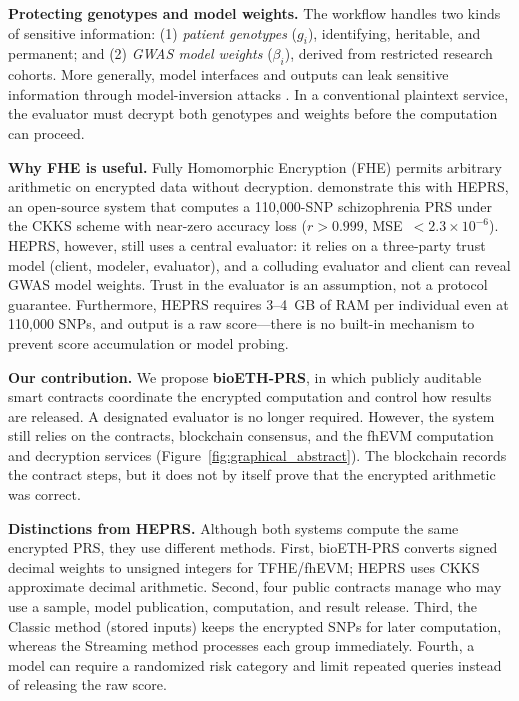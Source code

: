 \documentclass[10pt]{article}
\begin{document}
\textbf{Protecting genotypes and model weights.}
The workflow handles two kinds of sensitive information: (1)
\emph{patient genotypes} ($g_i$), identifying, heritable, and permanent; and
(2) \emph{GWAS model weights} ($\beta_i$), derived from restricted research cohorts.
More generally, model interfaces and outputs can leak sensitive information through
model-inversion attacks \citep{fredrikson2015modelinversion}.
In a conventional plaintext service, the evaluator must decrypt both genotypes and
weights before the computation can proceed.

\textbf{Why FHE is useful.}
Fully Homomorphic Encryption (FHE) permits arbitrary arithmetic on encrypted data
without decryption.  \citet{knight2026heprs} demonstrate this with
HEPRS, an open-source system that computes a 110,000-SNP schizophrenia PRS under
the CKKS scheme \citep{cheon2017ckks} with near-zero accuracy loss ($r > 0.999$,
MSE~$< 2.3 \times 10^{-6}$).  HEPRS, however, still uses a central evaluator:
it relies on a three-party trust model (client, modeler, evaluator), and a colluding
evaluator and client can reveal GWAS model weights.  Trust in the evaluator is an
assumption, not a protocol guarantee.  Furthermore, HEPRS requires 3--4~GB of RAM
per individual even at 110,000 SNPs, and output is a raw score---there is no built-in
mechanism to prevent score accumulation or model probing.

\textbf{Our contribution.}
We propose \textbf{bioETH-PRS}, in which publicly auditable smart contracts coordinate
the encrypted computation and control how results are released.  A designated
evaluator is no longer required.  However, the system still relies
on the contracts, blockchain consensus, and the fhEVM computation and decryption
services (Figure~\ref{fig:graphical_abstract}).  The blockchain records the contract
steps, but it does not by itself prove that the encrypted arithmetic was correct.

\smallskip\noindent\textbf{Distinctions from HEPRS.}
Although both systems compute the same encrypted PRS, they use different methods.
First, bioETH-PRS converts signed decimal weights to unsigned integers for TFHE/fhEVM;
HEPRS uses CKKS approximate decimal arithmetic.  Second, four public contracts manage
who may use a sample, model publication, computation, and result release.  Third, the
Classic method (stored inputs) keeps the encrypted SNPs for later computation, whereas the Streaming
method processes each group immediately.  Fourth, a model can require a randomized
risk category and limit repeated queries instead of releasing the raw score.
\end{document}
